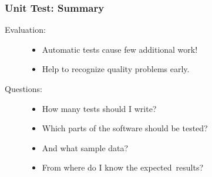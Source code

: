 \begin{frame}
 \frametitle{Unit Test: Summary}
 
 \begin{description}
 \item [Evaluation:] \hfill
 \begin{itemize} 
  \item Automatic tests cause few additional work!
  \item Help to recognize quality problems early.
\end{itemize}
\end{description}
 
\pause
 
 \begin{description}
 \item [Questions:] \hfill
\begin{itemize}
   \item How many tests should I write?
   \item Which parts of the software should be tested?
   \item And what sample data?
   \item From where do I know the  \glqq expected\grqq\ results?
\end{itemize}
\end{description}
\end{frame}


